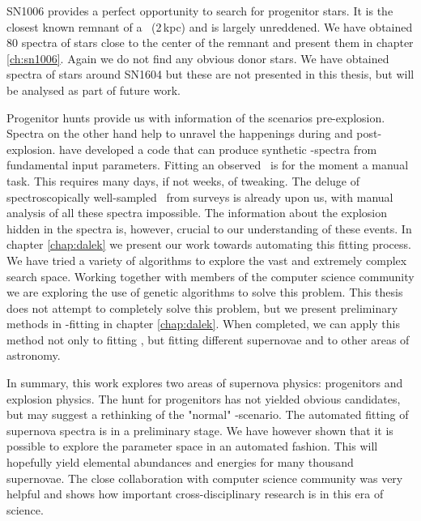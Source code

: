 SN1006 provides a perfect opportunity to search for progenitor stars. It is the closest known remnant of a \snia\ (2\,kpc) and is largely unreddened. We have obtained 80 spectra of stars close to the center of the remnant and present them in chapter \ref{ch:sn1006}. Again we do not find any obvious donor stars. We have obtained spectra of stars around SN1604 but these are not presented in this thesis, but will be analysed as part of future work.

Progenitor hunts provide us with information of the scenarios pre-explosion. Spectra on the other hand help to unravel the happenings during and post-explosion. \cite{2008MNRAS.386.1897M} have developed a code that can produce synthetic \snia-spectra from fundamental input parameters. Fitting an observed \snia\ is for the moment a manual task. This requires many days, if not weeks, of tweaking. The deluge of spectroscopically well-sampled \sneia\ from surveys is already upon us, with manual analysis of all these spectra impossible. The information about the explosion hidden in the spectra is, however, crucial to our understanding of these events. In chapter \ref{chap:dalek} we present our work towards automating this fitting process. We have tried a variety of algorithms to explore the vast and extremely complex search space. Working together with members of the computer science community we are exploring the use of genetic algorithms to solve this problem. This thesis does not attempt to completely solve this problem, but we present preliminary methods in \snia-fitting in chapter \ref{chap:dalek}. When completed, we can apply this method not only to fitting \snia, but fitting different supernovae and to other areas of astronomy. 

In summary, this work explores two areas of supernova physics: progenitors and explosion physics. The hunt for progenitors has not yielded obvious candidates, but may suggest a rethinking of the "normal" \sd-scenario. The automated fitting of supernova spectra is in a preliminary stage. We have however shown that it is possible to explore the parameter space in an automated fashion. This will hopefully yield elemental abundances and energies for many thousand supernovae. The close collaboration with computer science community was very helpful and shows how important cross-disciplinary research is in this era of science. 


